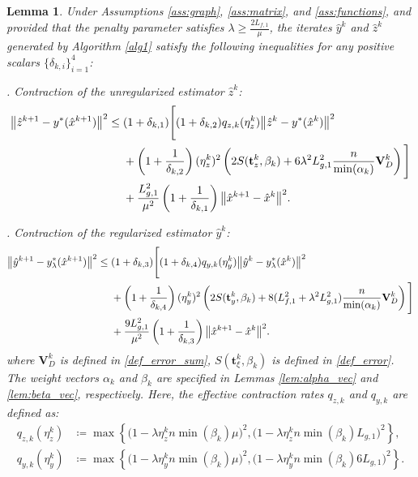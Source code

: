 \documentclass{article}
\theoremstyle{plain}
\newtheorem{lemma}[theorem]{Lemma}
\theoremstyle{definition}
\theoremstyle{remark}
\begin{document}
\begin{lemma}\label{lem:contraction_yz}
    Under Assumptions \ref{ass:graph}, \ref{ass:matrix}, and \ref{ass:functions}, and provided that the penalty parameter satisfies $\lambda \geq \frac{2L_{f,1}}{\mu}$, the iterates $\hat{y}^{k}$ and $\hat{z}^{k}$ generated by Algorithm \ref{alg1} satisfy the following inequalities for any positive scalars $\{\delta_{k,i}\}_{i=1}^4$:
    
    . Contraction of the unregularized estimator $\hat{z}^k$:
    \begin{align} \label{eq:z_contraction}
        \big\Vert\hat{z}^{k+1}-y^*(\hat{x}^{k+1})\big\Vert^2
        \leq{}& (1+\delta_{k,1}) \Bigg[ (1+\delta_{k,2})q_{z,k}(\eta_{z}^{k})\big\Vert\hat{z}^{k}- y^*(\hat{x}^{k})\big\Vert^{2} \notag \\
        &+ \left(1+\frac{1}{\delta_{k,2}}\right)(\eta_z^{k})^{2} \left(2S(\mathbf{t}_{z}^k,\beta_{k}) + 6\lambda^{2}L_{g,1}^{2}\frac{n}{\min(\alpha_{k})}\mathbf{V}_{D}^{k} \right) \Bigg] \notag \\
        &+ \frac{L_{g,1}^{2}}{\mu^{2}}\left(1+\frac{1}{\delta_{k,1}}\right)\big\Vert\hat{x}^{k+1}- \hat{x}^{k}\big\Vert^{2}.
    \end{align}

    . Contraction of the regularized estimator $\hat{y}^k$:
    \begin{align} \label{eq:y_contraction}
        \big\Vert\hat{y}^{k+1}-y_{\lambda}^*(\hat{x}^{k+1})\big\Vert^2
        \leq{}& (1+\delta_{k,3}) \Bigg[ (1+\delta_{k,4})q_{y,k}(\eta_{y}^{k})\big\Vert\hat{y}^{k}- y_{\lambda}^*(\hat{x}^{k})\big\Vert^{2} \notag \\
        &+ \left(1+\frac{1}{\delta_{k,4}}\right)(\eta_y^{k})^{2} \left(2S(\mathbf{t}_{y}^k,\beta_{k}) + 8(L_{f,1}^{2}+\lambda^{2}L_{g,1}^{2})\frac{n}{\min(\alpha_{k})}\mathbf{V}_{D}^{k} \right) \Bigg] \notag \\
        &+ \frac{9L_{g,1}^{2}}{\mu^{2}}\left(1+\frac{1}{\delta_{k,3}}\right)\big\Vert\hat{x}^{k+1}- \hat{x}^{k}\big\Vert^{2}.
    \end{align}
    where $\mathbf{V}_{D}^{k}$ is defined in \eqref{def_error_sum}, $S(\mathbf{t}_{\xi}^{k}, \beta_{k})$ is defined in \eqref{def_error}. The weight vectors $\alpha_{k}$ and $\beta_{k}$ are specified in Lemmas \ref{lem:alpha_vec} and \ref{lem:beta_vec}, respectively.
    Here, the effective contraction rates $q_{z,k}$ and $q_{y,k}$ are defined as:
    \begin{align*}
        q_{z,k}(\eta_{z}^{k}) &\coloneqq \max\left\{ \big(1-\lambda\eta_{z}^{k} n\min(\beta_{k})\mu\big)^{2}, \big(1-\lambda\eta_{z}^{k} n\min(\beta_{k})L_{g,1}\big)^{2} \right\}, \\
        q_{y,k}(\eta_{y}^{k}) &\coloneqq \max\left\{ \big(1-\lambda\eta_{y}^{k} n\min(\beta_{k})\mu\big)^{2}, \big(1-\lambda\eta_{y}^{k} n\min(\beta_{k})6L_{g,1}\big)^{2} \right\}.
    \end{align*}
\end{lemma}
\end{document}
